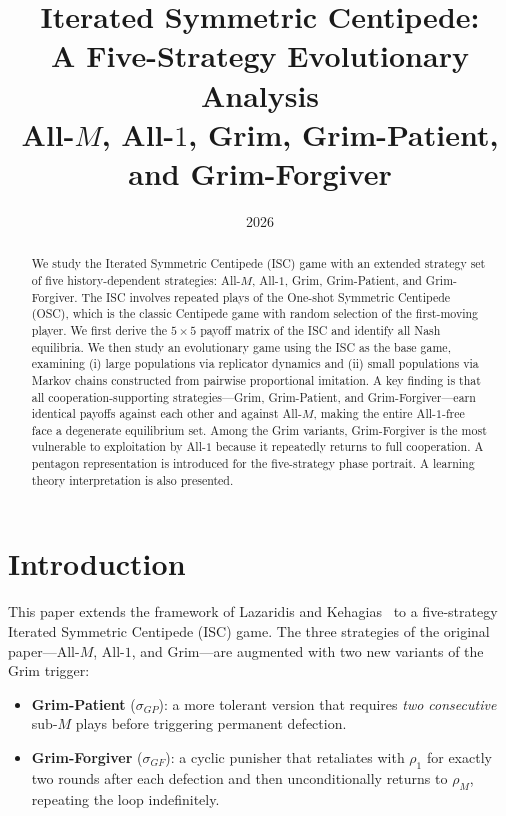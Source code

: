 \documentclass[12pt,a4paper]{article}
\title{\textbf{Iterated Symmetric Centipede:}\\[4pt]
       \textbf{A Five-Strategy Evolutionary Analysis}\\[6pt]
       \large All-$M$, All-$1$, Grim, Grim-Patient, and Grim-Forgiver}
\author{}
\date{2026}
\begin{document}
\maketitle

\begin{abstract}
We study the Iterated Symmetric Centipede (ISC) game with an extended
strategy set of five history-dependent strategies: All-$M$, All-$1$, Grim,
Grim-Patient, and Grim-Forgiver.  The ISC involves repeated plays of the
One-shot Symmetric Centipede (OSC), which is the classic Centipede game with
random selection of the first-moving player.  We first derive the $5\times5$
payoff matrix of the ISC and identify all Nash equilibria.  We then study
an evolutionary game using the ISC as the base game, examining (i) large
populations via replicator dynamics and (ii) small populations via Markov chains
constructed from pairwise proportional imitation.  A key finding is that
all cooperation-supporting strategies---Grim, Grim-Patient, and
Grim-Forgiver---earn identical payoffs against each other and against All-$M$,
making the entire All-$1$-free face a degenerate equilibrium set.  Among the
Grim variants, Grim-Forgiver is the most vulnerable to exploitation by
All-$1$ because it repeatedly returns to full cooperation.  A pentagon
representation is introduced for the five-strategy phase portrait.  A learning
theory interpretation is also presented.
\end{abstract}

\tableofcontents
\newpage

\section{Introduction}

This paper extends the framework of Lazaridis and Kehagias~\cite{LK2026} to a
five-strategy Iterated Symmetric Centipede (ISC) game.  The three strategies of
the original paper---All-$M$, All-$1$, and Grim---are augmented with two new
variants of the Grim trigger:

\begin{itemize}
\item \textbf{Grim-Patient} ($\sigma_{GP}$): a more tolerant version that
      requires \emph{two consecutive} sub-$M$ plays before triggering permanent
      defection.
\item \textbf{Grim-Forgiver} ($\sigma_{GF}$): a cyclic punisher that retaliates
      with $\rho_1$ for exactly two rounds after each defection and then
      unconditionally returns to $\rho_M$, repeating the loop indefinitely.
\end{itemize}
\end{document}
